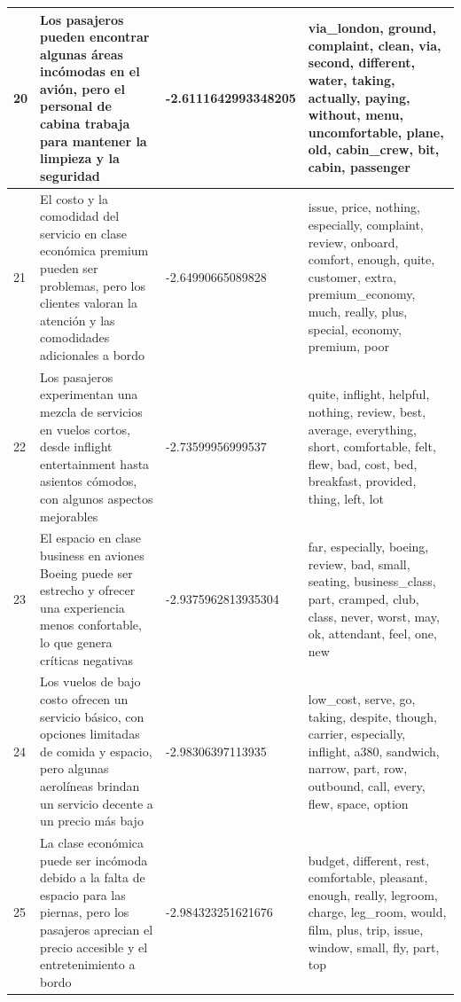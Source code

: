 \documentclass{report}
\begin{document}
{\begin{longtable}{|p{1cm}|p{4cm}|p{4cm}|p{6cm}|}
                    \hline
                    20 & Los pasajeros pueden encontrar algunas áreas incómodas en el avión, pero el personal de cabina trabaja para mantener la limpieza y la seguridad & -2.6111642993348205 & via\_london, ground, complaint, clean, via, second, different, water, taking, actually, paying, without, menu, uncomfortable, plane, old, cabin\_crew, bit, cabin, passenger \\
                    \hline
                    21 & El costo y la comodidad del servicio en clase económica premium pueden ser problemas, pero los clientes valoran la atención y las comodidades adicionales a bordo & -2.64990665089828 & issue, price, nothing, especially, complaint, review, onboard, comfort, enough, quite, customer, extra, premium\_economy, much, really, plus, special, economy, premium, poor \\
                    \hline
                    22 & Los pasajeros experimentan una mezcla de servicios en vuelos cortos, desde inflight entertainment hasta asientos cómodos, con algunos aspectos mejorables & -2.73599956999537 & quite, inflight, helpful, nothing, review, best, average, everything, short, comfortable, felt, flew, bad, cost, bed, breakfast, provided, thing, left, lot \\
                    \hline
                    23 & El espacio en clase business en aviones Boeing puede ser estrecho y ofrecer una experiencia menos confortable, lo que genera críticas negativas & -2.9375962813935304 & far, especially, boeing, review, bad, small, seating, business\_class, part, cramped, club, class, never, worst, may, ok, attendant, feel, one, new \\
                    \hline
                    24 & Los vuelos de bajo costo ofrecen un servicio básico, con opciones limitadas de comida y espacio, pero algunas aerolíneas brindan un servicio decente a un precio más bajo & -2.98306397113935 & low\_cost, serve, go, taking, despite, though, carrier, especially, inflight, a380, sandwich, narrow, part, row, outbound, call, every, flew, space, option \\
                    \hline
                    25 & La clase económica puede ser incómoda debido a la falta de espacio para las piernas, pero los pasajeros aprecian el precio accesible y el entretenimiento a bordo & -2.984323251621676 & budget, different, rest, comfortable, pleasant, enough, really, legroom, charge, leg\_room, would, film, plus, trip, issue, window, small, fly, part, top \\

\end{longtable}}
\end{document}
